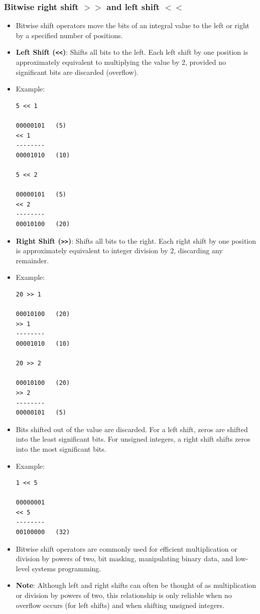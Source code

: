 \documentclass[10pt]{article}
\begin{document}
\newpage

\subsubsection{Bitwise right shift $>>$ and left shift $<<$}

\begin{itemize}
	\item Bitwise shift operators move the bits of an integral value to the left or right by a specified number of positions.

	\item \textbf{Left Shift (\texttt{<<})}: Shifts all bits to the left. Each left shift by one position is approximately equivalent to multiplying the value by 2, provided no significant bits are discarded (overflow).

	\item Example:
	\begin{verbatim}
5 << 1

00000101   (5)
<< 1
--------
00001010   (10)

5 << 2

00000101   (5)
<< 2
--------
00010100   (20)
	\end{verbatim}

	\item \textbf{Right Shift (\texttt{>>})}: Shifts all bits to the right. Each right shift by one position is approximately equivalent to integer division by 2, discarding any remainder.

	\item Example:
	\begin{verbatim}
20 >> 1

00010100   (20)
>> 1
--------
00001010   (10)

20 >> 2

00010100   (20)
>> 2
--------
00000101   (5)
	\end{verbatim}

	\item Bits shifted out of the value are discarded. For a left shift, zeros are shifted into the least significant bits. For unsigned integers, a right shift shifts zeros into the most significant bits.

	\item Example:
	\begin{verbatim}
1 << 5

00000001
<< 5
--------
00100000   (32)
	\end{verbatim}

	\item Bitwise shift operators are commonly used for efficient multiplication or division by powers of two, bit masking, manipulating binary data, and low-level systems programming.

	\item \textbf{Note}: Although left and right shifts can often be thought of as multiplication or division by powers of two, this relationship is only reliable when no overflow occurs (for left shifts) and when shifting unsigned integers.
\end{itemize}
\end{document}
